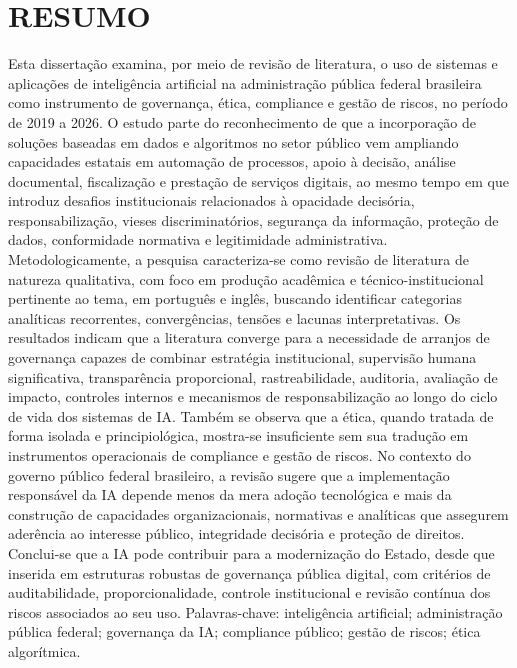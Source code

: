 \documentclass[12pt,a4paper]{article}
\begin{document}
\section*{RESUMO}
\label{sec:org6b70e9a}
Esta dissertação examina, por meio de revisão de literatura, o uso de sistemas e aplicações de inteligência artificial na administração pública federal brasileira como instrumento de governança, ética, compliance e gestão de riscos, no período de 2019 a 2026. O estudo parte do reconhecimento de que a incorporação de soluções baseadas em dados e algoritmos no setor público vem ampliando capacidades estatais em automação de processos, apoio à decisão, análise documental, fiscalização e prestação de serviços digitais, ao mesmo tempo em que introduz desafios institucionais relacionados à opacidade decisória, responsabilização, vieses discriminatórios, segurança da informação, proteção de dados, conformidade normativa e legitimidade administrativa. Metodologicamente, a pesquisa caracteriza-se como revisão de literatura de natureza qualitativa, com foco em produção acadêmica e técnico-institucional pertinente ao tema, em português e inglês, buscando identificar categorias analíticas recorrentes, convergências, tensões e lacunas interpretativas. Os resultados indicam que a literatura converge para a necessidade de arranjos de governança capazes de combinar estratégia institucional, supervisão humana significativa, transparência proporcional, rastreabilidade, auditoria, avaliação de impacto, controles internos e mecanismos de responsabilização ao longo do ciclo de vida dos sistemas de IA. Também se observa que a ética, quando tratada de forma isolada e principiológica, mostra-se insuficiente sem sua tradução em instrumentos operacionais de compliance e gestão de riscos. No contexto do governo público federal brasileiro, a revisão sugere que a implementação responsável da IA depende menos da mera adoção tecnológica e mais da construção de capacidades organizacionais, normativas e analíticas que assegurem aderência ao interesse público, integridade decisória e proteção de direitos. Conclui-se que a IA pode contribuir para a modernização do Estado, desde que inserida em estruturas robustas de governança pública digital, com critérios de auditabilidade, proporcionalidade, controle institucional e revisão contínua dos riscos associados ao seu uso.
Palavras-chave: inteligência artificial; administração pública federal; governança da IA; compliance público; gestão de riscos; ética algorítmica.
\end{document}
